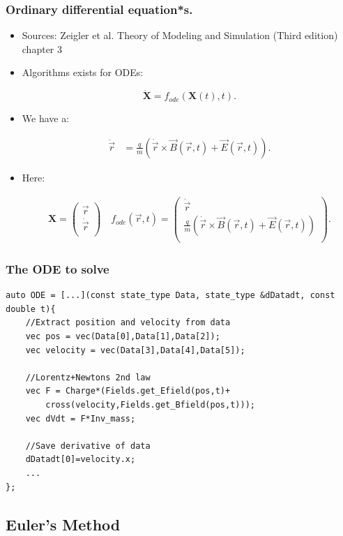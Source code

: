 \documentclass{beamer}
\newcommand{\mvec}[2]{
\ensuremath{\left(
\begin{array}{c}
#1\\
#2\\
\end{array}
\right)}
}
\begin{document}
\begin{frame}
\frametitle{Ordinary differential equation*s.}
\begin{itemize}
\item<1-> {\color{gray} Sources: Zeigler et al. Theory of Modeling and Simulation (Third edition) chapter 3}

\item<1-> Algorithms exists for ODEs:

\begin{equation*}
\dot{\mathbf{X}} = f_{ode}(\mathbf{X}(t),t).
\end{equation*}

\item<2-> We have a:

\begin{align*}
\ddot{\vec{r}} &= \frac{q}{m} ( \dot{\vec{r}}\times \vec{B}(\vec{r},t)+\vec{E}(\vec{r},t)).
\end{align*}

\item<3-> Here:

\begin{align*}
\mathbf{X} = \mvec{\vec{r}}{\dot{\vec{r}}} \quad f_{ode}(\vec{r},t) = \mvec{\dot{\vec{r}}}{\frac{q}{m} ( \dot{\vec{r}}\times \vec{B}(\vec{r},t)+\vec{E}(\vec{r},t))}.
\end{align*}
\end{itemize}
\end{frame}

\newif\ifadditional
\additionaltrue

\ifadditional
\begin{frame}[fragile]
\frametitle{The ODE to solve}
\begin{lstlisting}
auto ODE = [...](const state_type Data, state_type &dDatadt, const double t){
    //Extract position and velocity from data
    vec pos = vec(Data[0],Data[1],Data[2]);
    vec velocity = vec(Data[3],Data[4],Data[5]);

    //Lorentz+Newtons 2nd law
    vec F = Charge*(Fields.get_Efield(pos,t)+
        cross(velocity,Fields.get_Bfield(pos,t)));
    vec dVdt = F*Inv_mass;

    //Save derivative of data
    dDatadt[0]=velocity.x;
    ...
};
\end{lstlisting}
\end{frame}
\fi


\subsection{Euler's Method}
\end{document}
